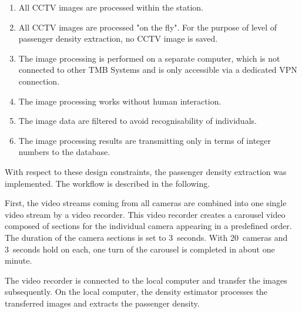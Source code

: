 \begin{enumerate}
  \item All CCTV images are processed within the station.
      \item All CCTV images are processed "on the fly". For the purpose of level of passenger density extraction, no CCTV image is saved.
  \item The image processing is performed on a separate computer, which is not connected to other TMB Systems and is only accessible via a dedicated VPN connection.
  \item The image processing works without human interaction.
  \item The image data are filtered to avoid recognisability of individuals.
  \item The image processing results are transmitting only in terms of integer numbers to the database.
\end{enumerate}

With respect to these design constraints, the passenger density extraction was implemented. The workflow is described in the following.

First, the video streams coming from all cameras are combined into one single video stream by a video recorder. This video recorder creates a carousel video composed of sections for the individual camera appearing in a predefined order. The duration of the camera sections is set to 3~seconds. With 20~cameras and 3~seconds hold on each, one turn of the carousel is completed in about one minute.

The video recorder is connected to the local computer and transfer the images subsequently. On the local computer, the density estimator processes the transferred images and extracts the passenger density.

